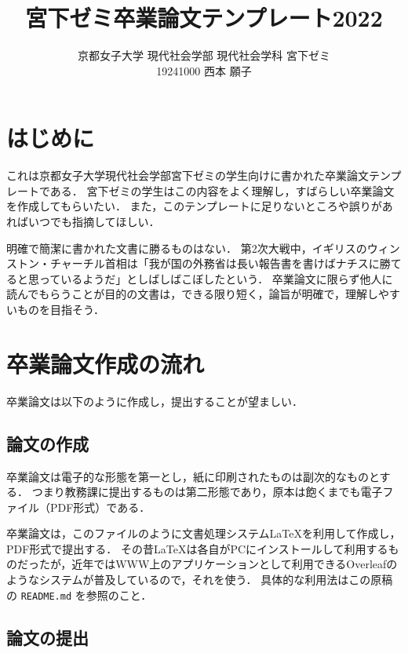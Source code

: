 \documentclass[a4paper,twocolumn,10pt]{ltjsarticle}
\title{宮下ゼミ卒業論文テンプレート2022}
\author{京都女子大学 現代社会学部 現代社会学科 宮下ゼミ\\
19241000 西本 願子}
\begin{document}
\maketitle

\section{はじめに}

これは京都女子大学現代社会学部宮下ゼミの学生向けに書かれた卒業論文テンプレートである．
宮下ゼミの学生はこの内容をよく理解し，すばらしい卒業論文を作成してもらいたい．
また，このテンプレートに足りないところや誤りがあればいつでも指摘してほしい．

明確で簡潔に書かれた文書に勝るものはない．
第2次大戦中，イギリスのウィンストン・チャーチル首相は「我が国の外務省は長い報告書を書けばナチスに勝てると思っているようだ」としばしばこぼしたという\cite{newsweek}．
卒業論文に限らず他人に読んでもらうことが目的の文書は，できる限り短く，論旨が明確で，理解しやすいものを目指そう．

\section{卒業論文作成の流れ}

卒業論文は以下のように作成し，提出することが望ましい．

\subsection{論文の作成}

卒業論文は電子的な形態を第一とし，紙に印刷されたものは副次的なものとする．
つまり教務課に提出するものは第二形態であり，原本は飽くまでも電子ファイル（PDF形式）である．

卒業論文は，このファイルのように文書処理システム\LaTeX{}を利用して作成し，PDF形式で提出する．
その昔\LaTeX{}は各自がPCにインストールして利用するものだったが，近年ではWWW上のアプリケーションとして利用できるOverleaf\cite{refwww}のようなシステムが普及しているので，それを使う．
具体的な利用法はこの原稿の {\tt README.md} を参照のこと\cite{readme}．

\subsection{論文の提出}
\end{document}
